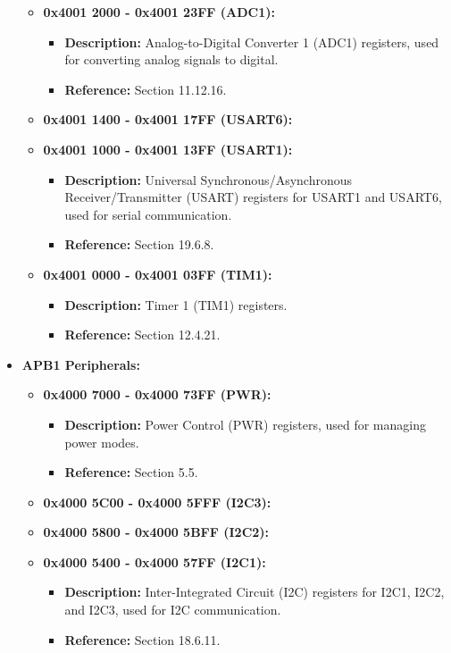 \documentclass{article}
\begin{document}
\begin{itemize}
\begin{itemize}
        \item \textbf{0x4001 2000 - 0x4001 23FF (ADC1):} 
        \begin{itemize}
            \item \textbf{Description:} Analog-to-Digital Converter 1 (ADC1) registers, used for converting analog signals to digital.
            \item \textbf{Reference:} Section 11.12.16.
        \end{itemize}
        
        \item \textbf{0x4001 1400 - 0x4001 17FF (USART6):}
        \item \textbf{0x4001 1000 - 0x4001 13FF (USART1):} 
        \begin{itemize}
            \item \textbf{Description:} Universal Synchronous/Asynchronous Receiver/Transmitter (USART) registers for USART1 and USART6, used for serial communication.
            \item \textbf{Reference:} Section 19.6.8.
        \end{itemize}
        
        \item \textbf{0x4001 0000 - 0x4001 03FF (TIM1):} 
        \begin{itemize}
            \item \textbf{Description:} Timer 1 (TIM1) registers.
            \item \textbf{Reference:} Section 12.4.21.
        \end{itemize}
    \end{itemize}
    
    \item \textbf{APB1 Peripherals:}
    \begin{itemize}
        \item \textbf{0x4000 7000 - 0x4000 73FF (PWR):} 
        \begin{itemize}
            \item \textbf{Description:} Power Control (PWR) registers, used for managing power modes.
            \item \textbf{Reference:} Section 5.5.
        \end{itemize}
        
        \item \textbf{0x4000 5C00 - 0x4000 5FFF (I2C3):}
        \item \textbf{0x4000 5800 - 0x4000 5BFF (I2C2):}
        \item \textbf{0x4000 5400 - 0x4000 57FF (I2C1):}
        \begin{itemize}
            \item \textbf{Description:} Inter-Integrated Circuit (I2C) registers for I2C1, I2C2, and I2C3, used for I2C communication.
            \item \textbf{Reference:} Section 18.6.11.
        \end{itemize}
        

\end{itemize}
\end{itemize}
\end{document}
